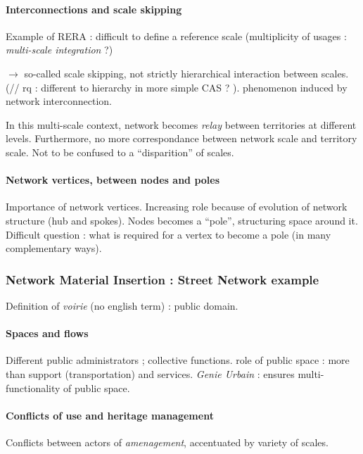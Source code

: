 \paragraph{Interconnections and scale skipping}

Example of RERA : difficult to define a reference scale (multiplicity of usages : \emph{multi-scale integration} ?)

$\rightarrow$ so-called scale skipping, not strictly hierarchical interaction between scales. (// rq : different to hierarchy in more simple CAS ? ). phenomenon induced by network interconnection.

In this multi-scale context, network becomes \textit{relay} between territories at different levels. Furthermore, no more correspondance between network scale and territory scale. Not to be confused to a ``disparition'' of scales.

\paragraph{Network vertices, between nodes and poles}

Importance of network vertices. Increasing role because of evolution of network structure (hub and spokes). Nodes becomes a ``pole'', structuring space around it. Difficult question : what is required for a vertex to become a pole (in many complementary ways).

\subsubsection*{Network Material Insertion : Street Network example}

Definition of \textit{voirie} (no english term) : public domain.

\paragraph{Spaces and flows}

Different public administrators ; collective functions. role of public space : more than support (transportation) and services. \textit{Genie Urbain} : ensures multi-functionality of public space.

\paragraph{Conflicts of use and heritage management}

Conflicts between actors of \textit{amenagement}, accentuated by variety of scales.

